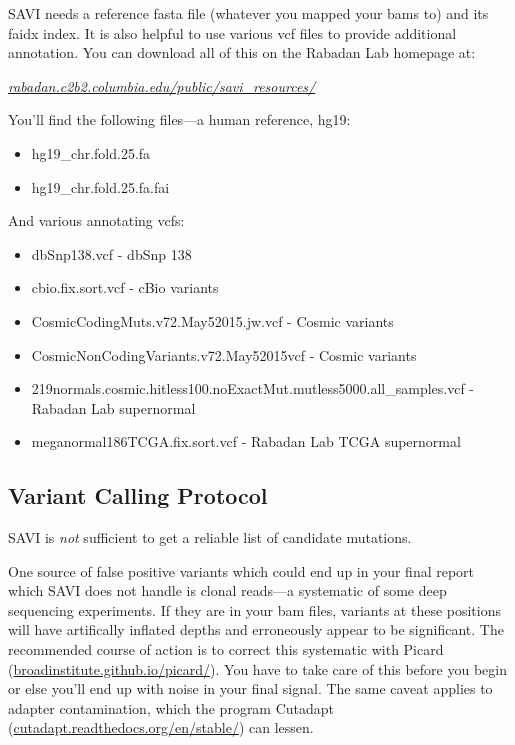 \documentclass[letterpaper,14pt]{memoir}
\begin{document}
SAVI needs a reference fasta file (whatever you mapped your bams to) and
its faidx index. It is also helpful to use various vcf files to provide
additional annotation. You can download all of this on the Rabadan Lab
homepage at:
\begin{center}
\href{http://rabadan.c2b2.columbia.edu/public/savi_resources/}{\textit{rabadan.c2b2.columbia.edu/public/savi\_resources/}}
\end{center}
You'll find the following files---a human reference, hg19:

\begin{itemize}
\tightlist
\item
  hg19\_chr.fold.25.fa
\item
  hg19\_chr.fold.25.fa.fai
\end{itemize}

\noindent And various annotating vcfs:

\begin{itemize}
\tightlist
\item
  dbSnp138.vcf - dbSnp 138
\item
  cbio.fix.sort.vcf - cBio variants
\item
  CosmicCodingMuts.v72.May52015.jw.vcf - Cosmic variants
\item
  CosmicNonCodingVariants.v72.May52015vcf - Cosmic variants
\item
  219normals.cosmic.hitless100.noExactMut.mutless5000.all\_samples.vcf -
  Rabadan Lab supernormal
\item
  meganormal186TCGA.fix.sort.vcf - Rabadan Lab TCGA supernormal
\end{itemize}

\subsection{Variant Calling Protocol}\label{Variant Calling Protocol}

SAVI is \emph{not} sufficient to get a reliable list of candidate
mutations. 

One source of false positive variants which could end up in your final report which SAVI does not handle is clonal reads---a systematic of some deep sequencing experiments. If they are in your bam files, variants at these positions will have artifically inflated depths and erroneously appear to be significant. The recommended course of action is to correct this systematic with Picard (\href{http://broadinstitute.github.io/picard/}{broadinstitute.github.io/picard/}). You have to take care of this before you begin or else you'll end up with noise in your final signal. The same caveat applies to adapter contamination, which the program Cutadapt (\href{http://cutadapt.readthedocs.org/en/stable/}{cutadapt.readthedocs.org/en/stable/}) can lessen.
\end{document}

